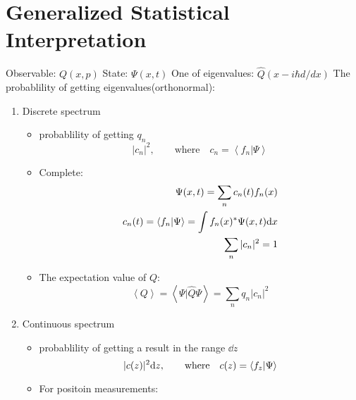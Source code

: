 \section{Generalized Statistical Interpretation}
Observable: \(Q(x,p)\) \newline
State: \(\Psi(x,t)\) \newline
One of eigenvalues: \(\hat{Q}(x-i\hbar d/dx)\) \newline
The probablility of getting eigenvalues(orthonormal):
\begin{enumerate}
	\item Discrete spectrum 
	\begin{itemize}
		\item probablility of getting \(q_n\) \[
		|c_n|^2,\qquad\text{where}\quad c_n=\left\langle f_n|\Psi\right\rangle \]
		\item Complete: \[\begin{split}
			\Psi(x,t) = \sum_n c_n(t)f_n(x)  \\
			c_n(t)=\left\langle f_n|\Psi\right\rangle  = \int f_n(x)^*\Psi(x,t){\rm d}x \\
			\sum_n|c_n|^2=1
		\end{split}\]
		\item The expectation value of \(Q\): \[
		\left\langle Q\right\rangle  = \left\langle \Psi|\hat{Q}\Psi\right\rangle = \sum_n q_n|c_n|^2
		\]
	\end{itemize}    
	\item Continuous spectrum 
	\begin{itemize}
		\item probablility of getting a result in the range \(\dd z\) 
		\[|c(z)|^2{\rm d}z,\qquad\text{where}\quad c(z)=\left\langle f_z|\Psi\right\rangle \]
		\item For positoin measurements:
		

\end{itemize}
\end{enumerate}
